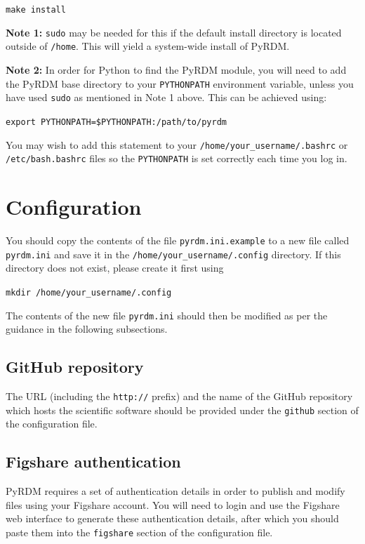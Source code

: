 \documentclass[a4paper,11pt]{report}
\begin{document}
  \texttt{make install}

\textbf{Note 1:} \texttt{sudo} may be needed for this if the default install directory is located outside of \texttt{/home}. This will yield a system-wide install of PyRDM.

\textbf{Note 2:} In order for Python to find the PyRDM module, you will need to add the PyRDM base directory to your \texttt{PYTHONPATH} environment variable, unless you have used \texttt{sudo} as mentioned in Note 1 above. This can be achieved using:

  \texttt{export PYTHONPATH=\$PYTHONPATH:/path/to/pyrdm}

You may wish to add this statement to your \texttt{/home/your\_username/.bashrc} or \texttt{/etc/bash.bashrc} files so the \texttt{PYTHONPATH} is set correctly each time you log in.

\section{Configuration}
You should copy the contents of the file \texttt{pyrdm.ini.example} to a new file called \texttt{pyrdm.ini} and save it in the \texttt{/home/your\_username/.config} directory. If this directory does not exist, please create it first using

  \texttt{mkdir /home/your\_username/.config}

The contents of the new file \texttt{pyrdm.ini} should then be modified as per the guidance in the following subsections.

\subsection{GitHub repository}
The URL (including the \texttt{http://} prefix) and the name of the GitHub repository which hosts the scientific software should be provided under the \texttt{github} section of the configuration file.

\subsection{Figshare authentication}\label{sect:authentication}
PyRDM requires a set of authentication details in order to publish and modify files using your Figshare account. You will need to login and use the Figshare web interface to generate these authentication details, after which you should paste them into the \texttt{figshare} section of the configuration file.
\end{document}
